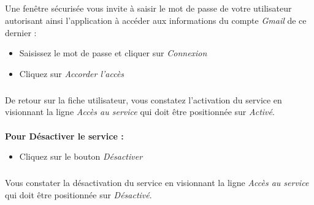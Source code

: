 \documentclass[12pt,a4paper,titlepage]{article}
\begin{document}
			\subparagraph{}
			Une fenêtre sécurisée vous invite à saisir le mot de passe de votre utilisateur autorisant ainsi l'application à accéder aux informations du compte \emph{Gmail} de ce dernier :
			
			\begin{itemize}
			\item Saisissez le mot de passe et cliquer sur \emph{Connexion}
			\item Cliquez sur \emph{Accorder l'accès}
			\end{itemize}
			
			\subparagraph{}
			De retour sur la fiche utilisateur, vous constatez l'activation du service en visionnant la ligne \emph{Accès au service} qui doit être positionnée sur \emph{Activé}.
			
			\paragraph{}
			\textbf{Pour Désactiver le service :}
			
			\begin{itemize}
			\item Cliquez sur le bouton \emph{Désactiver}
			\end{itemize}
			
			\subparagraph{}
			Vous constater la désactivation du service en visionnant la ligne \emph{Accès au service} qui doit être positionnée sur \emph{Désactivé}.
			
\end{document}
